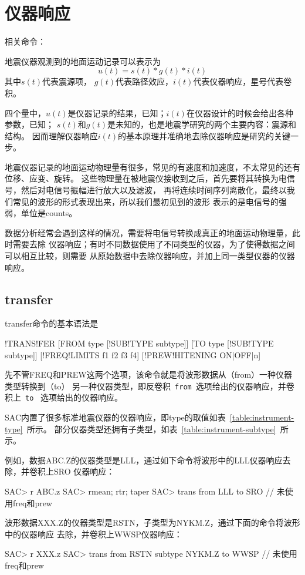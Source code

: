 \section{仪器响应}
\label{sec:instrument-response}
相关命令：

地震仪器观测到的地面运动记录可以表示为
\[  u(t) = s(t) * g(t) * i(t) \]
其中$s(t)$代表震源项， $g(t)$代表路径效应，$i(t)$代表仪器响应，星号代表卷积。

四个量中，$u(t)$是仪器记录的结果，已知；$i(t)$在仪器设计的时候会给出各种参数，已知；
$s(t)$和$g(t)$是未知的，也是地震学研究的两个主要内容：震源和结构。
因而理解仪器响应$i(t)$的基本原理并准确地去除仪器响应是研究的关键一步。

地震仪器记录的地面运动物理量有很多，常见的有速度和加速度，不太常见的还有位移、应变、旋转。
这些物理量在被地震仪接收到之后，首先要将其转换为电信号，然后对电信号振幅进行放大以及滤波，
再将连续时间序列离散化，最终以我们常见的波形的形式表现出来，所以我们最初见到的波形
表示的是电信号的强弱，单位是counts。

数据分析经常会遇到这样的情况，需要将电信号转换成真正的地面运动物理量，此时需要去除
仪器响应；有时不同数据使用了不同类型的仪器，为了使得数据之间可以相互比较，则需要
从原始数据中去除仪器响应，并加上同一类型仪器的仪器响应。

\subsection{transfer}
transfer命令的基本语法是
\begin{SACSTX}
!TRANS!FER [FROM type [!SUB!TYPE subtype]] [TO type [!SUB!TYPE subtype]]
[!FREQ!LIMITS f1 f2 f3 f4] [!PREW!HITENING ON|OFF|n]
\end{SACSTX}

先不管FREQ和PREW这两个选项，该命令就是将波形数据从（from）一种仪器类型转换到（to）
另一种仪器类型，即反卷积~\verb+from+~选项给出的仪器响应，并卷积上~\verb+to+~
选项给出的仪器响应。

SAC内置了很多标准地震仪器的仪器响应，即type的取值如表~\ref{table:instrument-type}~所示。
部分仪器类型还拥有子类型，如表~\ref{table:instrument-subtype}~所示。

例如，数据ABC.Z的仪器类型是LLL，通过如下命令将波形中的LLL仪器响应去除，并卷积上SRO
仪器响应：
\begin{SACCode}
SAC> r ABC.z
SAC> rmean; rtr; taper
SAC> trans from LLL to SRO      // 未使用freq和prew
\end{SACCode}

波形数据XXX.Z的仪器类型是RSTN，子类型为NYKM.Z，通过下面的命令将波形中的仪器响应
去除，并卷积上WWSP仪器响应：
\begin{SACCode}
SAC> r XXX.z
SAC> trans from RSTN subtype NYKM.Z to WWSP  // 未使用freq和prew
\end{SACCode}

